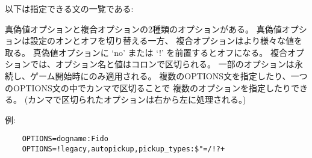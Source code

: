 以下は指定できる文の一覧である:

\blist{}
\item[\bb{OPTIONS}]
真偽値オプションと複合オプションの2種類のオプションがある。
真偽値オプションは設定のオンとオフを切り替える一方、
複合オプションはより様々な値を取る。
真偽値オプションに `no' または `!' を前置するとオフになる。
複合オプションでは、オプション名と値はコロンで区切られる。
一部のオプションは永続し、ゲーム開始時にのみ適用される。
複数のOPTIONS文を指定したり、一つのOPTIONS文の中でカンマで区切ることで
複数のオプションを指定したりできる。
(カンマで区切られたオプションは右から左に処理される。)

例:
\begin{verbatim}
    OPTIONS=dogname:Fido
    OPTIONS=!legacy,autopickup,pickup_types:$"=/!?+
\end{verbatim}

